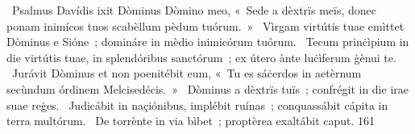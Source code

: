 {~Psalmus Davídis}
{%
ixit Dòminus Dòmino meo, «~Sede a dèxtrïs meïs, donec ponam inimícos tuos scabèllum pèdum tuórum.~»
~Vìrgam virtútis tuae emìttet Dòminus e Sióne~; domináre in mèdio inimicórum tuórum.
~Tecum prinċìpium in die virtútis tuae, in splendóribus sanctórum~; ex útero ànte luċìferum ġènui te.
~Jurávit Dòminus et non poenitébit eum, «~Tu es sáċerdos in aetèrnum secùndum órdinem Melcisedécis.~»
~Dòminus a dèxtrïs tuïs~; confrégit in die irae suae reġes.
~Judicábit in naçiónibus, implébit ruínas~; conquassábit cápita in terra multórum.
~De torrènte in via bìbet~; proptèrea exaltábit caput.
}
{16}{1}
